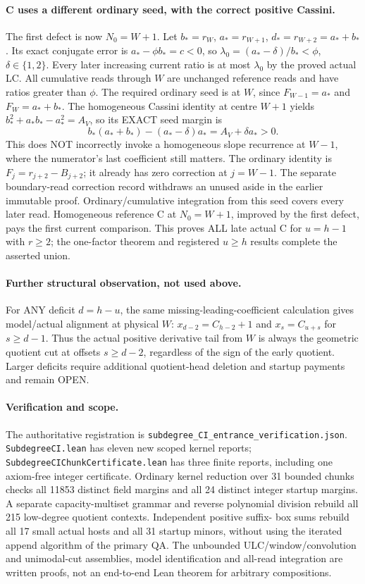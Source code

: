 \paragraph{C uses a different ordinary seed, with the correct positive Cassini.}
The first defect is now $N_0=W+1$. Let $b_*=r_W$, $a_*=r_{W+1}$,
$d_*=r_{W+2}=a_*+b_*$. Its exact conjugate error is
$a_*-\phi b_*=c<0$, so
$\lambda_0=(a_*-\delta)/b_*<\phi$, $\delta\in\{1,2\}$.
Every later increasing current ratio is at most $\lambda_0$ by
the proved actual LC. All cumulative reads through $W$ are
unchanged reference reads and have ratios greater than $\phi$.
The required ordinary seed is at $W$, since
$F_{W-1}=a_*$ and $F_W=a_*+b_*$.
The homogeneous Cassini identity at centre $W+1$ yields
$b_*^2+a_*b_*-a_*^2=A_V$, so its EXACT seed margin is
\[
 b_*(a_*+b_*)-(a_*-\delta)a_*
                 =A_V+\delta a_*>0.                \tag{5}
\]
This does NOT incorrectly invoke a homogeneous slope recurrence at
$W-1$, where the numerator's last coefficient still matters.
The ordinary identity is $F_j=r_{j+2}-B_{j+2}$; it already has
zero correction at $j=W-1$. The separate boundary-read correction
record withdraws an unused aside in the earlier immutable proof.
Ordinary/cumulative integration from this seed covers every later
read. Homogeneous reference C at $N_0=W+1$, improved by the first
defect, pays the first current comparison. This proves ALL
late actual C for $u=h-1$ with $r\ge2$; the one-factor theorem
and registered $u\ge h$ results complete the asserted union.

\paragraph{Further structural observation, not used above.}
For ANY deficit $d=h-u$, the same missing-leading-coefficient
calculation gives model/actual alignment at physical $W$:
$x_{d-2}=C_{h-2}+1$ and $x_s=C_{u+s}$ for $s\ge d-1$.
Thus the actual positive derivative tail from $W$ is always the
geometric quotient cut at offsets $s\ge d-2$, regardless of the
sign of the early quotient. Larger deficits require additional
quotient-head deletion and startup payments and remain OPEN.

\paragraph{Verification and scope.}
The authoritative registration is
\texttt{subdegree\_CI\_entrance\_verification.json}.
\texttt{SubdegreeCI.lean} has eleven new scoped kernel reports;
\texttt{SubdegreeCIChunkCertificate.lean} has three finite reports,
including one axiom-free integer certificate. Ordinary kernel
reduction over 31 bounded chunks checks all 11853 distinct field
margins and all 24 distinct integer startup margins. A separate
capacity-multiset grammar and reverse polynomial division rebuild
all 215 low-degree quotient contexts. Independent positive suffix-
box sums rebuild all 17 small actual hosts and all 31 startup minors,
without using the iterated append algorithm of the primary QA.
The unbounded ULC/window/convolution and unimodal-cut assemblies,
model identification and all-read integration are written proofs,
not an end-to-end Lean theorem for arbitrary compositions.

